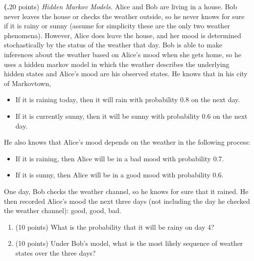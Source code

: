 \documentclass[12pt]{amsart}
\newenvironment{statement}[1]{\smallskip\noindent\color[rgb]{0.0,0.0,0.0} {\bf #1.}}{}
\theoremstyle{definition}
\theoremstyle{remark}
\newcommand{\1}{\mathds{1}}
\begin{document}
\newpage
\begin{statement}{2}
(20 points) \emph{Hidden Markov Models. }
Alice and Bob are living in a house. Bob never leaves the house or checks the weather outside, so he never knows for sure if it is rainy or sunny (assume for simplicity these are the only two weather phenomena).
However, Alice does leave the house, and her mood is determined stochastically by the status of the weather that day.
Bob is able to make inferences about the weather based on Alice's mood when she gets home, so he uses a hidden markov model in which the weather describes the underlying hidden states and Alice's mood are his observed states. He knows that in his city of Markovtown, 
\begin{itemize}
    \item If it is raining today, then it will rain with probability $0.8$ on the next day.
    \item If it is currently sunny, then it will be sunny with probability $0.6$ on the next day.
\end{itemize}
He also knows that Alice's mood depends on the weather in the following process:
\begin{itemize}
    \item If it is raining, then Alice will be in a bad mood with probability $0.7$.
    \item If it is sunny, then Alice will be in a good mood with probability $0.6$.
\end{itemize}
One day, Bob checks the weather channel, so he knows for sure that it rained. He then recorded Alice's mood the next three days (not including the day he checked the weather channel): good, good, bad.
\begin{enumerate}
    \item (10 points) What is the probability that it will be rainy on day $4$?
    \item (10 points) Under Bob's model, what is the most likely sequence of weather states over the three days?
\end{enumerate}

\end{statement}

\newpage
\end{document}
